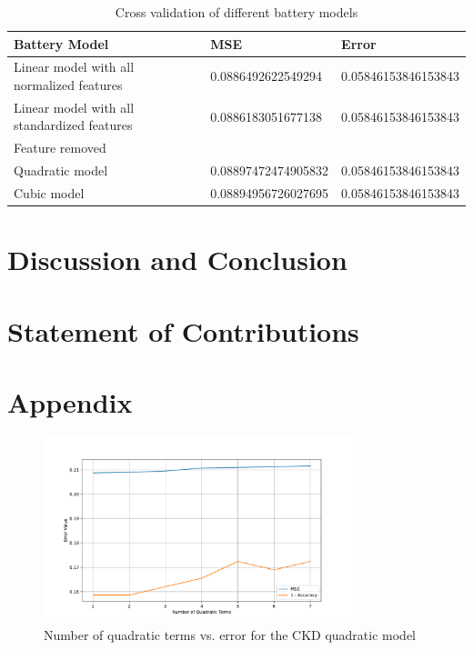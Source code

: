 \documentclass{article}
\begin{document}
\begin{table}[h!]
  \centering
  \caption{Cross validation of different battery models}
  \begin{tabular}{|l|l|l|}
  \hline
  \textbf{Battery Model}                            & \textbf{MSE}                  & \textbf{Error}               \\ \hline
  Linear model with all normalized features         & 0.0886492622549294            & 0.05846153846153843          \\ \hline
  Linear model with all standardized features       & 0.0886183051677138            & 0.05846153846153843          \\ \hline
  Feature removed                                   &            &           \\ \hline
  Quadratic model                                   & 0.08897472474905832           & 0.05846153846153843          \\ \hline
  Cubic model                                       & 0.08894956726027695           & 0.05846153846153843          \\ \hline
  \end{tabular}
\end{table}

\section{Discussion and Conclusion}

\section{Statement of Contributions}

\section{Appendix}

\begin{figure}[H]
  \centering
  \includegraphics[width=0.8\textwidth]{quad_ckd.pdf}
  \caption{Number of quadratic terms vs. error for the CKD quadratic model}
  \label{fig:quad_ckd}
\end{figure}
\end{document}
